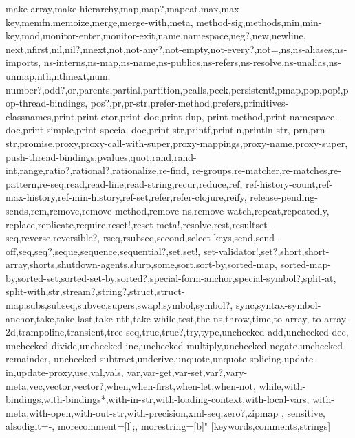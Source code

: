 {{make-array,make-hierarchy,map,map?,mapcat,max,max-key,memfn,memoize,merge,merge-with,meta,%
method-sig,methods,min,min-key,mod,monitor-enter,monitor-exit,name,namespace,neg?,new,newline,%
next,nfirst,nil,nil?,nnext,not,not-any?,not-empty,not-every?,not=,ns,ns-aliases,ns-imports,%
ns-interns,ns-map,ns-name,ns-publics,ns-refers,ns-resolve,ns-unalias,ns-unmap,nth,nthnext,num,%
number?,odd?,or,parents,partial,partition,pcalls,peek,persistent!,pmap,pop,pop!,pop-thread-bindings,%
pos?,pr,pr-str,prefer-method,prefers,primitives-classnames,print,print-ctor,print-doc,print-dup,%
print-method,print-namespace-doc,print-simple,print-special-doc,print-str,printf,println,println-str,%
prn,prn-str,promise,proxy,proxy-call-with-super,proxy-mappings,proxy-name,proxy-super,%
push-thread-bindings,pvalues,quot,rand,rand-int,range,ratio?,rational?,rationalize,re-find,%
re-groups,re-matcher,re-matches,re-pattern,re-seq,read,read-line,read-string,recur,reduce,ref,%
ref-history-count,ref-max-history,ref-min-history,ref-set,refer,refer-clojure,reify,%
release-pending-sends,rem,remove,remove-method,remove-ns,remove-watch,repeat,repeatedly,%
replace,replicate,require,reset!,reset-meta!,resolve,rest,resultset-seq,reverse,reversible?,%
rseq,rsubseq,second,select-keys,send,send-off,seq,seq?,seque,sequence,sequential?,set,set!,%
set-validator!,set?,short,short-array,shorts,shutdown-agents,slurp,some,sort,sort-by,sorted-map,%
sorted-map-by,sorted-set,sorted-set-by,sorted?,special-form-anchor,special-symbol?,split-at,%
split-with,str,stream?,string?,struct,struct-map,subs,subseq,subvec,supers,swap!,symbol,symbol?,%
sync,syntax-symbol-anchor,take,take-last,take-nth,take-while,test,the-ns,throw,time,to-array,%
to-array-2d,trampoline,transient,tree-seq,true,true?,try,type,unchecked-add,unchecked-dec,%
unchecked-divide,unchecked-inc,unchecked-multiply,unchecked-negate,unchecked-remainder,%
unchecked-subtract,underive,unquote,unquote-splicing,update-in,update-proxy,use,val,vals,%
var,var-get,var-set,var?,vary-meta,vec,vector,vector?,when,when-first,when-let,when-not,%
while,with-bindings,with-bindings*,with-in-str,with-loading-context,with-local-vars,%
with-meta,with-open,with-out-str,with-precision,xml-seq,zero?,zipmap
},%
   sensitive,%
   alsodigit=-,%
   morecomment=[l];,%
   morestring=[b]"%
  }[keywords,comments,strings]%


